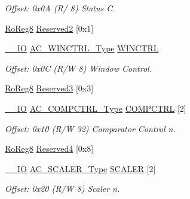 \begin{DoxyCompactItemize}
\begin{DoxyCompactList}\small\item\em Offset\+: 0x0A (R/ 8) Status C. \end{DoxyCompactList}\item 
\mbox{\hyperlink{group___s_a_m_d21_e15_a__definitions_ga0d957f1433aaf5d70e4dc2b68288442d}{Ro\+Reg8}} \mbox{\hyperlink{struct_ac_a99ee50bfa44e107c16a546d778dcdcc7}{Reserved2}} \mbox{[}0x1\mbox{]}
\item 
\mbox{\hyperlink{core__cm0plus_8h_aec43007d9998a0a0e01faede4133d6be}{\+\_\+\+\_\+\+IO}} \mbox{\hyperlink{union_a_c___w_i_n_c_t_r_l___type}{A\+C\+\_\+\+W\+I\+N\+C\+T\+R\+L\+\_\+\+Type}} \mbox{\hyperlink{struct_ac_a9f13a070a13d1914783991226d8ec54d}{W\+I\+N\+C\+T\+RL}}
\begin{DoxyCompactList}\small\item\em Offset\+: 0x0C (R/W 8) Window Control. \end{DoxyCompactList}\item 
\mbox{\hyperlink{group___s_a_m_d21_e15_a__definitions_ga0d957f1433aaf5d70e4dc2b68288442d}{Ro\+Reg8}} \mbox{\hyperlink{struct_ac_ab22abf5c83fa4a01809facc55e0fda29}{Reserved3}} \mbox{[}0x3\mbox{]}
\item 
\mbox{\hyperlink{core__cm0plus_8h_aec43007d9998a0a0e01faede4133d6be}{\+\_\+\+\_\+\+IO}} \mbox{\hyperlink{union_a_c___c_o_m_p_c_t_r_l___type}{A\+C\+\_\+\+C\+O\+M\+P\+C\+T\+R\+L\+\_\+\+Type}} \mbox{\hyperlink{struct_ac_a03a1ac0b5cd22c33531cdb31674b7eb2}{C\+O\+M\+P\+C\+T\+RL}} \mbox{[}2\mbox{]}
\begin{DoxyCompactList}\small\item\em Offset\+: 0x10 (R/W 32) Comparator Control n. \end{DoxyCompactList}\item 
\mbox{\hyperlink{group___s_a_m_d21_e15_a__definitions_ga0d957f1433aaf5d70e4dc2b68288442d}{Ro\+Reg8}} \mbox{\hyperlink{struct_ac_ab7b3e550ab30de0179365b0293537564}{Reserved4}} \mbox{[}0x8\mbox{]}
\item 
\mbox{\hyperlink{core__cm0plus_8h_aec43007d9998a0a0e01faede4133d6be}{\+\_\+\+\_\+\+IO}} \mbox{\hyperlink{union_a_c___s_c_a_l_e_r___type}{A\+C\+\_\+\+S\+C\+A\+L\+E\+R\+\_\+\+Type}} \mbox{\hyperlink{struct_ac_a29fbafe05122f7ccc3f4ef20e7eb39fe}{S\+C\+A\+L\+ER}} \mbox{[}2\mbox{]}
\begin{DoxyCompactList}\small\item\em Offset\+: 0x20 (R/W 8) Scaler n. \end{DoxyCompactList}\end{DoxyCompactItemize}


